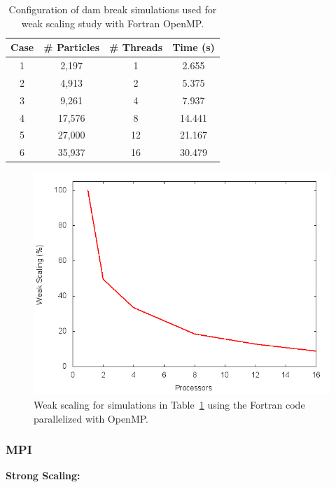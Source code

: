 \documentclass{scrartcl}
\begin{document}
      \begin{table}
      	\begin{center}
      		\begin{tabular}{| c | c | c | c |}
      			\hline
      			Case & \# Particles & \# Threads & Time (s) \\ \hline
      			1 &  2,197 &  1 & 2.655 \\ \hline		  		
      			2 &  4,913 &  2 & 5.375 \\ \hline		  		
      			3 &  9,261 &  4 & 7.937 \\ \hline		  		
      			4 &  17,576 &  8 & 14.441 \\ \hline		  		
      			5 &  27,000& 12 & 21.167 \\ \hline		  		
      			6 &  35,937 & 16 & 30.479 \\ \hline		  		
      		\end{tabular}
      		\caption{Configuration of dam break simulations used for weak scaling study with Fortran OpenMP.}
      		\label{tab:fompws}
      	\end{center}
      \end{table}
  
  
    \begin{figure}
    	\begin{center}
    		\includegraphics[width=0.7\columnwidth]{./fort_scaling/ws.png}
    		\caption{Weak scaling for simulations in Table~\ref{tab:fompws} using the Fortran code parallelized with OpenMP.}
    		\label{fig:ws_fort_omp}
    	\end{center}
    \end{figure}
  
  \subsubsection{MPI}
  \textbf{Strong Scaling:}
  
\end{document}
